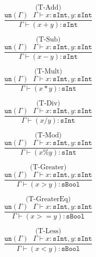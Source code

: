\documentclass{l4proj}
\begin{document}
\begin{figure}[H]
\begin{subfigure}{0.32\textwidth}
\[\text{(T-Add)}\]
\[\frac{\texttt{un}(\Gamma) \:\:\: \Gamma \vdash x:\texttt{sInt}, y:\texttt{sInt}}{\Gamma \vdash (x+y) : \texttt{sInt}}\]
\vspace{\fill}
\end{subfigure}
\begin{subfigure}{0.32\textwidth}
\[\text{(T-Sub)}\]
\[\frac{\texttt{un}(\Gamma) \:\:\: \Gamma \vdash x:\texttt{sInt}, y:\texttt{sInt}}{\Gamma \vdash (x-y) : \texttt{sInt}}\]
\vspace{\fill}
\end{subfigure}
\begin{subfigure}{0.32\textwidth}
\[\text{(T-Mult)}\]
\[\frac{\texttt{un}(\Gamma) \:\:\: \Gamma \vdash x:\texttt{sInt}, y:\texttt{sInt}}{\Gamma \vdash (x*y) : \texttt{sInt}}\]
\vspace{\fill}
\end{subfigure}
\begin{subfigure}{0.32\textwidth}
\[\text{(T-Div)}\]
\[\frac{\texttt{un}(\Gamma) \:\:\: \Gamma \vdash x:\texttt{sInt}, y:\texttt{sInt}}{\Gamma \vdash (x/y) : \texttt{sInt}}\]
\vspace{\fill}
\end{subfigure}
\begin{subfigure}{0.32\textwidth}
\[\text{(T-Mod)}\]
\[\frac{\texttt{un}(\Gamma) \:\:\: \Gamma \vdash x:\texttt{sInt}, y:\texttt{sInt}}{\Gamma \vdash (x\%y) : \texttt{sInt}}\]
\vspace{\fill}
\end{subfigure}
\begin{subfigure}{0.32\textwidth}
\[\text{(T-Greater)}\]
\[\frac{\texttt{un}(\Gamma) \:\:\: \Gamma \vdash x:\texttt{sInt}, y:\texttt{sInt}}{\Gamma \vdash (x>y) : \texttt{sBool}}\]
\vspace{\fill}
\end{subfigure}
\begin{subfigure}{0.32\textwidth}
\[\text{(T-GreaterEq)}\]
\[\frac{\texttt{un}(\Gamma) \:\:\: \Gamma \vdash x:\texttt{sInt}, y:\texttt{sInt}}{\Gamma \vdash (x>=y) : \texttt{sBool}}\]
\vspace{\fill}
\end{subfigure}
\begin{subfigure}{0.32\textwidth}
\[\text{(T-Less)}\]
\[\frac{\texttt{un}(\Gamma) \:\:\: \Gamma \vdash x:\texttt{sInt}, y:\texttt{sInt}}{\Gamma \vdash (x<y) : \texttt{sBool}}\]
\vspace{\fill}
\end{subfigure}

\end{figure}
\end{document}
